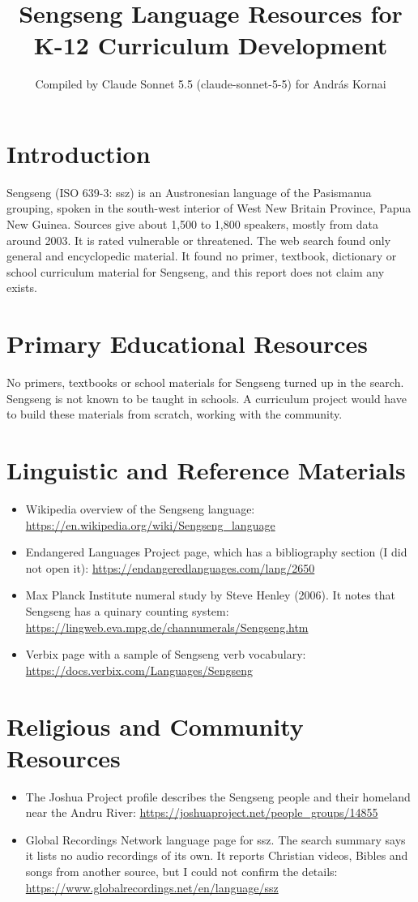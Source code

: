 \documentclass[12pt]{article}
\title{Sengseng Language Resources for K-12 Curriculum Development}
\author{Compiled by Claude Sonnet 5.5 (claude-sonnet-5-5) for Andr\'as Kornai}
\date{}
\begin{document}
\maketitle

\section{Introduction}
Sengseng (ISO 639-3: ssz) is an Austronesian language of the Pasismanua grouping, spoken in the south-west interior of West New Britain Province, Papua New Guinea. Sources give about 1,500 to 1,800 speakers, mostly from data around 2003. It is rated vulnerable or threatened. The web search found only general and encyclopedic material. It found no primer, textbook, dictionary or school curriculum material for Sengseng, and this report does not claim any exists.

\section{Primary Educational Resources}
No primers, textbooks or school materials for Sengseng turned up in the search. Sengseng is not known to be taught in schools. A curriculum project would have to build these materials from scratch, working with the community.

\section{Linguistic and Reference Materials}
\begin{itemize}
\item Wikipedia overview of the Sengseng language: \url{https://en.wikipedia.org/wiki/Sengseng_language}
\item Endangered Languages Project page, which has a bibliography section (I did not open it): \url{https://endangeredlanguages.com/lang/2650}
\item Max Planck Institute numeral study by Steve Henley (2006). It notes that Sengseng has a quinary counting system: \url{https://lingweb.eva.mpg.de/channumerals/Sengseng.htm}
\item Verbix page with a sample of Sengseng verb vocabulary: \url{https://docs.verbix.com/Languages/Sengseng}
\end{itemize}

\section{Religious and Community Resources}
\begin{itemize}
\item The Joshua Project profile describes the Sengseng people and their homeland near the Andru River: \url{https://joshuaproject.net/people_groups/14855}
\item Global Recordings Network language page for ssz. The search summary says it lists no audio recordings of its own. It reports Christian videos, Bibles and songs from another source, but I could not confirm the details: \url{https://www.globalrecordings.net/en/language/ssz}
\end{itemize}
\end{document}
